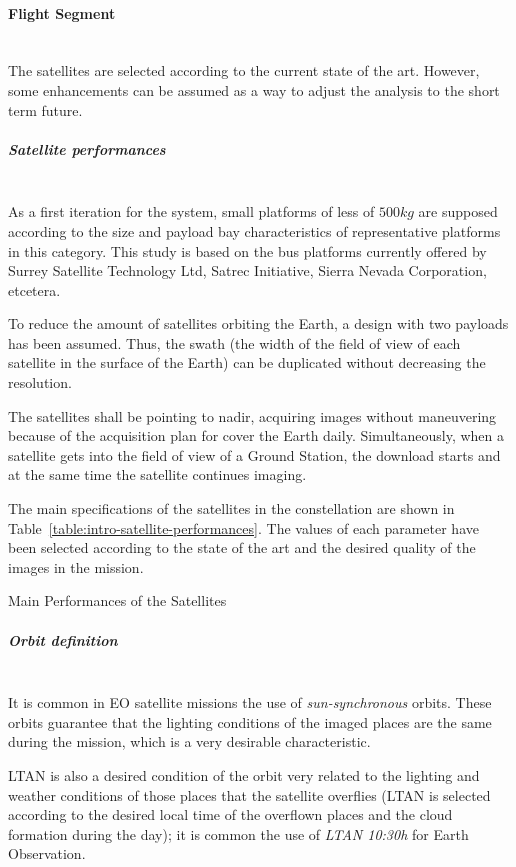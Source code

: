 \paragraph{Flight Segment}~\\
The satellites are selected according to the current state of the art. However,
some enhancements can be assumed as a way to adjust the analysis to the short
term future.


\subparagraph{Satellite performances}~\\
As a first iteration for the system, small platforms of less of $500kg$ are supposed according to the size and payload bay characteristics of representative platforms in this category. This study is based on the bus platforms currently offered by Surrey Satellite Technology Ltd, Satrec Initiative, Sierra Nevada Corporation, etcetera.

To reduce the amount of satellites orbiting the Earth, a design with two payloads has been assumed. Thus, the swath (the width of the field of view of each satellite in the surface of the Earth) can be duplicated without decreasing the resolution.

The satellites shall be pointing to nadir, acquiring images without maneuvering because of the acquisition plan for cover the Earth daily. Simultaneously, when a satellite gets into the field of view of a Ground Station, the download starts and at the same time the satellite continues imaging.

The main specifications of the satellites in the constellation are shown in Table~\ref{table:intro-satellite-performances}. The values of each parameter have been selected according to the state of the art and the desired quality of the images in the mission.

\begin{table}[hp]
  \centering
  {\small
  
  }
  \caption{Main Performances of the Satellites}
  \label{table:intro-satellite-performances}
\end{table}


\subparagraph{Orbit definition}~\\
It is common in \ac{EO} satellite missions the use of \emph{sun-synchronous} orbits. These orbits guarantee that the lighting conditions of the imaged places are the same during the mission, which is a very desirable characteristic.

\ac{LTAN} is also a desired condition of the orbit very related to the lighting and weather conditions of those places that the satellite overflies (\ac{LTAN} is selected according to the desired local time of the overflown places and the cloud formation during the day); it is common the use of \emph{LTAN 10:30h} for Earth Observation.

